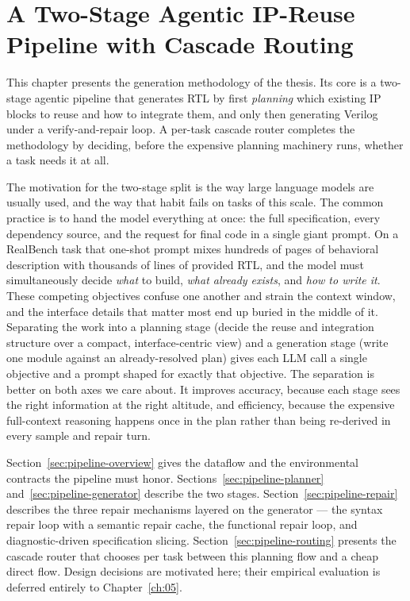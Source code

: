 
\chapter{A Two-Stage Agentic IP-Reuse Pipeline with Cascade Routing}
\label{ch:03}

This chapter presents the generation methodology of the thesis. Its
core is a two-stage agentic pipeline that generates RTL by first
\emph{planning} which existing IP blocks to reuse and how to integrate
them, and only then generating Verilog under a verify-and-repair loop.
A per-task cascade router completes the methodology by deciding,
before the expensive planning machinery runs, whether a task needs it
at all.

The motivation for the two-stage split is the way large language models
are usually used, and the way that habit fails on tasks of this
scale. The common practice is to hand the model everything at once: the
full specification, every dependency source, and the request for final
code in a single giant prompt. On a RealBench task that one-shot prompt
mixes hundreds of pages of behavioral description with thousands of
lines of provided RTL, and the model must simultaneously decide
\emph{what} to build, \emph{what already exists}, and \emph{how to write
it}. These competing objectives confuse one another and strain the
context window, and the interface details that matter most end up
buried in the middle of it. Separating the work into a planning stage (decide the
reuse and integration structure over a compact, interface-centric view)
and a generation stage (write one module against an already-resolved
plan) gives each LLM call a single objective and a prompt shaped for
exactly that objective. The separation is better on both axes we care
about. It improves accuracy, because each stage sees the right information at the
right altitude, and efficiency, because the expensive full-context
reasoning happens once in the plan rather than being re-derived in
every sample and repair turn.

Section~\ref{sec:pipeline-overview}
gives the dataflow and the environmental contracts the pipeline must honor.
Sections~\ref{sec:pipeline-planner} and~\ref{sec:pipeline-generator} describe
the two stages. Section~\ref{sec:pipeline-repair} describes the three repair
mechanisms layered on the generator --- the syntax repair loop with a
semantic repair cache, the functional repair loop, and diagnostic-driven
specification slicing. Section~\ref{sec:pipeline-routing} presents the
cascade router that chooses per task between this planning flow and a cheap
direct flow. Design decisions are motivated here; their empirical
evaluation is deferred entirely to Chapter~\ref{ch:05}.

